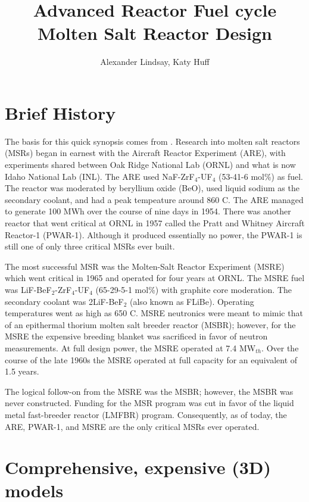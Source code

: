 \documentclass{article}
\title{Advanced Reactor Fuel cycle Molten Salt Reactor Design}
\author{Alexander Lindsay, Katy Huff} %
\begin{document}
\maketitle

\section{Brief History}

The basis for this quick synopsis comes from
\cite{wiki:Molten_salt_reactor}. Research into molten salt reactors (MSRs) began
in earnest with the Aircraft Reactor Experiment (ARE), with experiments shared
between Oak Ridge National Lab (ORNL) and what is now Idaho National Lab
(INL). The ARE used NaF-ZrF$_4$-UF$_4$ (53-41-6 mol\%) as fuel. The reactor was
moderated by beryllium oxide (BeO), used liquid sodium as the secondary coolant,
and had a peak tempeature around 860 \textdegree C. The ARE managed to generate
100 MWh over the course of nine days in 1954. There was another reactor that
went critical at ORNL in 1957 called the Pratt and Whitney Aircraft Reactor-1
(PWAR-1). Although it produced essentially no power, the PWAR-1 is still one of
only three critical MSRs ever built.

The most successful MSR was the Molten-Salt Reactor Experiment (MSRE) which went
critical in 1965 and operated for four years at ORNL. The MSRE fuel was
LiF-BeF$_2$-ZrF$_4$-UF$_4$ (65-29-5-1 mol\%) with graphite core moderation. The
secondary coolant was 2LiF-BeF$_2$ (also known as FLiBe). Operating temperatures
went as high as 650 \textdegree C. MSRE neutronics were meant to mimic that of
an epithermal thorium molten salt breeder reactor (MSBR); however, for the MSRE
the expensive breeding blanket was sacrificed in favor of neutron
measurements. At full design power, the MSRE operated at 7.4 MW$_{th}$. Over the
course of the late 1960s the MSRE operated at full capacity for an equivalent of
1.5 years.

The logical follow-on from the MSRE was the MSBR; however, the MSBR was never
constructed. Funding for the MSR program was cut in favor of the liquid metal
fast-breeder reactor (LMFBR) program. Consequently, as of today, the ARE,
PWAR-1, and MSRE are the only critical MSRs ever operated.

\section{Comprehensive, expensive (3D) models}
\end{document}

